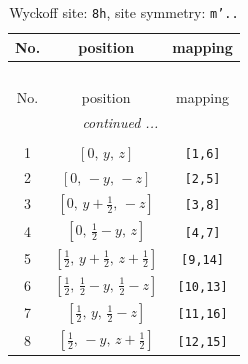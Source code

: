 \documentclass[fleqn,8pt]{jsarticle}
\begin{document}
\begin{longtable}{ccc}
\caption{Wyckoff site: {\tt 8h}, site symmetry: {\tt m'..}}
 \\
 \hline \hline
No. & position & mapping \\ \hline \endfirsthead

\multicolumn{2}{l}{\tablename\ \thetable{}} \\
 \hline \hline
No. & position & mapping \\ \hline \endhead

 \hline \hline
\multicolumn{2}{r}{\footnotesize\it continued ...} \\ \endfoot

 \hline \hline
\multicolumn{2}{r}{} \\ \endlastfoot

1 & $\left[ 0,\, y,\, z \right]$ & {\tt [1,6]} \\ \hline
2 & $\left[ 0,\, - y,\, - z \right]$ & {\tt [2,5]} \\ \hline
3 & $\left[ 0,\, y + \frac{1}{2},\, - z \right]$ & {\tt [3,8]} \\ \hline
4 & $\left[ 0,\, \frac{1}{2} - y,\, z \right]$ & {\tt [4,7]} \\ \hline
5 & $\left[ \frac{1}{2},\, y + \frac{1}{2},\, z + \frac{1}{2} \right]$ & {\tt [9,14]} \\ \hline
6 & $\left[ \frac{1}{2},\, \frac{1}{2} - y,\, \frac{1}{2} - z \right]$ & {\tt [10,13]} \\ \hline
7 & $\left[ \frac{1}{2},\, y,\, \frac{1}{2} - z \right]$ & {\tt [11,16]} \\ \hline
8 & $\left[ \frac{1}{2},\, - y,\, z + \frac{1}{2} \right]$ & {\tt [12,15]} \\
\end{longtable}
\renewcommand{\arraystretch}{1.2}
\end{document}

